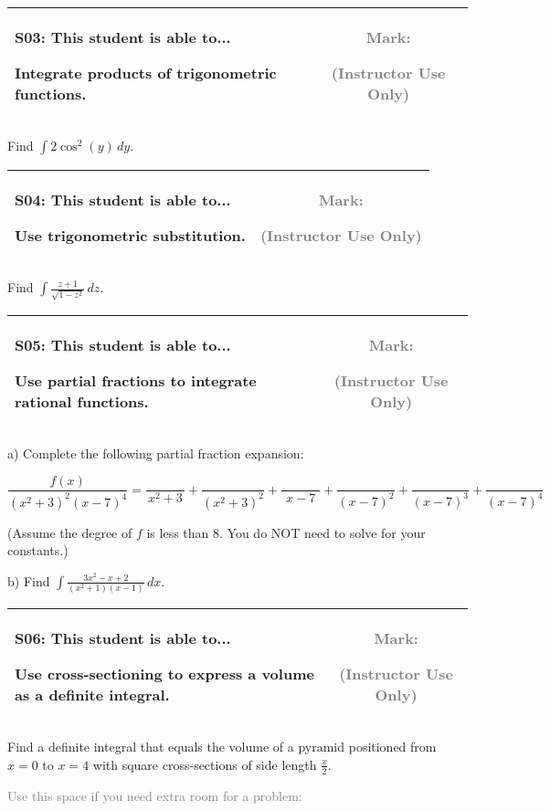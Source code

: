 \documentclass[12pt]{article}
\newcommand{\standardQuestion}[2]{
\newpage
\begin{center}
  \begin{tabular}{|l|c|}
  \hline
    \parbox{5in}{
      \textbf{#1}: This student is able to...\\
      #2
    }
  &
    \parbox{1in}{
      \vspace{0.1in}
      \footnotesize \textcolor{gray}{Mark:}
      \vspace{0.7in}

      \tiny \textcolor{gray}{(Instructor Use Only)}
    }
  \\\hline
  \end{tabular}
\end{center}
}
\begin{document}
\standardQuestion{S03}{
  Integrate products of trigonometric functions.
}

Find \(\int2\cos^2(y)\,dy\).



\standardQuestion{S04}{
  Use trigonometric substitution.
}

Find \(\displaystyle\int\frac{z+1}{\sqrt{1-z^2}}\,dz\).




\standardQuestion{S05}{
  Use partial fractions to integrate rational functions.
}

a) Complete the following partial fraction expansion:

\[
  \frac{f(x)}{(x^2+3)^2(x-7)^4}
    =
  \frac{\hspace{3em}}{x^2+3}
    +
  \frac{\hspace{3em}}{(x^2+3)^2}
    +
  \frac{\hspace{3em}}{x-7}
    +
  \frac{\hspace{3em}}{(x-7)^2}
    +
  \frac{\hspace{3em}}{(x-7)^3}
    +
  \frac{\hspace{3em}}{(x-7)^4}
\]

\vspace{1em}

(Assume the degree of \(f\) is less than \(8\).
You do NOT need to solve for your constants.)

\vspace{1em}

b) Find \(\displaystyle\int\frac{3x^2-x+2}{(x^2+1)(x-1)}\,dx\).

\vfill




\standardQuestion{S06}{
  Use cross-sectioning to express a volume as a definite integral.
}

Find a definite integral that equals the volume of a pyramid positioned
from \(x=0\) to \(x=4\) with square cross-sections of side length
\(\frac{x}{2}\).






\newpage

\textcolor{gray}{Use this space if you need extra room for a problem:}
\end{document}
